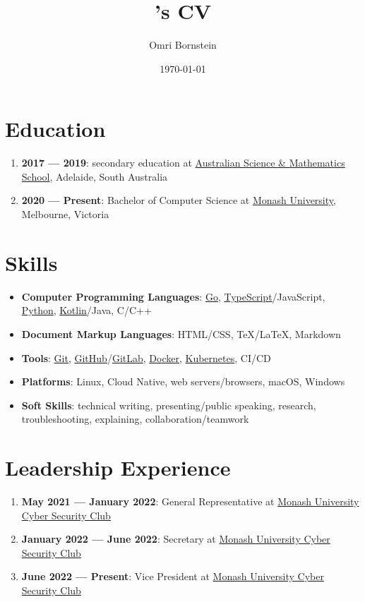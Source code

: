 \documentclass[a4paper, 10pt]{article}
\author{Omri Bornstein}
\title{\theauthor's CV}
\date{\today}
\begin{document}
	\section{Education}
	\begin{enumerate}
		\item \textbf{2017 --- 2019}: secondary education at \href{https://asms.sa.edu.au}{Australian Science \& Mathematics School}, Adelaide, South Australia
		\item \textbf{2020 --- Present}: Bachelor of Computer Science at \href{https://www.monash.edu/it}{Monash University}, Melbourne, Victoria
	\end{enumerate}

	\section{Skills}
	\begin{itemize}
		\item \textbf{Computer Programming Languages}: \href{https://go.dev}{Go}, \href{https://typescriptlang.org}{TypeScript}/JavaScript, \href{https://python.org}{Python}, \href{https://kotlinlang.org}{Kotlin}/Java, C/C++
		\item \textbf{Document Markup Languages}: HTML/CSS, \TeX/\LaTeX, Markdown
		\item \textbf{Tools}: \href{https://git-scm.com}{Git}, \href{https://github.com}{GitHub}/\href{https://gitlab.com}{GitLab}, \href{https://www.docker.com}{Docker}, \href{https://kubernetes.io}{Kubernetes}, CI/CD
		\item \textbf{Platforms}: Linux, Cloud Native, web servers/browsers, macOS, Windows
		\item \textbf{Soft Skills}: technical writing, presenting/public speaking, research, troubleshooting, explaining, collaboration/teamwork
	\end{itemize}

	\section{Leadership Experience}
	\begin{enumerate}
		\item \textbf{May 2021 --- January 2022}: General Representative at \href{https://monsec.io/team/}{Monash University Cyber Security Club}
		\item \textbf{January 2022 --- June 2022}: Secretary at \href{https://monsec.io/team/}{Monash University Cyber Security Club}
		\item \textbf{June 2022 --- Present}: Vice President at \href{https://monsec.io/team/}{Monash University Cyber Security Club}
	\end{enumerate}
\end{document}
